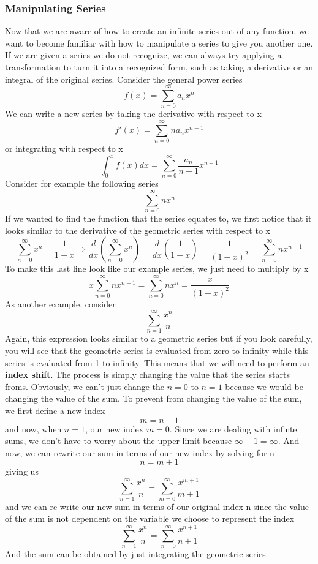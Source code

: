\documentclass{article}
\newcommand{\be}{\begin{equation}}
\newcommand{\ee}{\end{equation}}
\newcommand{\sumzero}{\sum_{n=0}^\infty}
\newcommand{\sumone}{\sum_{n=1}^\infty}
\begin{document}
\subsubsection*{Manipulating Series}
Now that we are aware of how to create an infinite series out of any function, we want to become familiar with how to manipulate a series to give you another one.
If we are given a series we do not recognize, we can always try applying a transformation to turn it into a recognized form, such as taking a derivative or an integral of the original series.
Consider the general power series
\be
f(x) = \sumzero a_nx^n
\ee
We can write a new series by taking the derivative with respect to x
\be
f'(x) = \sumzero na_nx^{n-1}
\ee
or integrating with respect to x
\be
\int_{0}^{x} f(x) dx = \sumzero \frac{a_n}{n+1}x^{n+1}
\ee
Consider for example the following series
\be
\sumzero nx^n
\ee
If we wanted to find the function that the series equates to, we first notice that it looks similar to the derivative of the geometric series with respect to x
\be
	\sumzero x^n = \frac{1}{1-x} \Rightarrow \frac{d}{dx} \left( \sumzero x^n\right) = \frac{d}{dx} \left( \frac{1}{1-x} \right) = \frac{1}{(1-x)^2} = \sumzero nx^{n-1}
\ee
To make this last line look like our example series, we just need to multiply by x
\be
x \sumzero nx^{n-1} = \sumzero nx^{n} = \frac{x}{(1-x)^2}
\ee
As another example, consider
\be
\sumone \frac{x^n}{n}
\ee
Again, this expression looks similar to a geometric series but if you look carefully, you will see that the geometric series is evaluated from zero to infinity while this series is evaluated from 1 to infinity.
This means that we will need to perform an \textbf{index shift}.
The process is simply changing the value that the series starts froms.
Obviously, we can't just change the $n = 0$ to $n = 1$ because we would be changing the value of the sum.
To prevent from changing the value of the sum, we first define a new index
\be
m = n - 1
\ee
and now, when $n = 1$, our new index $m = 0$.
Since we are dealing with infinte sums, we don't have to worry about the upper limit because $\infty - 1 = \infty$.
And now, we can rewrite our sum in terms of our new index by solving for n
\be
n = m + 1
\ee
giving us
\be
\sumone \frac{x^n}{n} = \sum_{m = 0}^{\infty} \frac{x^{m + 1}}{m + 1}
\ee
and we can re-write our new sum in terms of our original index n since the value of the sum is not dependent on the variable we choose to represent the index
\be
\sumone \frac{x^n}{n} = \sum_{n = 0}^{\infty} \frac{x^{n + 1}}{n + 1}
\ee
And the sum can be obtained by just integrating the geometric series
\end{document}
